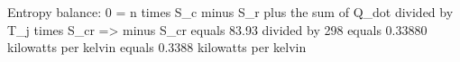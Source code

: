 Entropy balance:  
0 = n times S_c minus S_r plus the sum of Q_dot divided by T_j times S_cr  
=> minus S_cr equals 83.93 divided by 298 equals 0.33880 kilowatts per kelvin equals 0.3388 kilowatts per kelvin